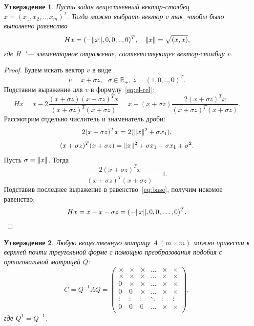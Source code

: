 \documentclass[11pt,a4paper,twoside]{report}
\numberwithin{equation}{section}
\newtheorem*{statement}{Утверждение}
\theoremstyle{definition}
\theoremstyle{plain}
\DeclarePairedDelimiter\norm{\lVert}{\rVert}
\begin{document}
\begin{statement}
    Пусть задан вещественный вектор-столбец $x=(x_1, x_2, .. , x_m)^{T}$.
    Тогда можно выбрать вектор $v$ так, чтобы было выполнено равенство
    $$
        Hx=(-\norm{x},0,0,..,0)^{T}, ~~~\norm{x}=\sqrt{(x,x)},
    $$
    где H~"--- элементарное отражение, соответствующее вектор-столбцу $v$.
\end{statement}
%
%
\begin{proof}
    Будем искать вектор $v$ в виде
    $$
        v=x+\sigma z, ~~~\sigma \in \mathbb{R}_+,~z=(1,0,..,0)^{T}.
    $$
    Подставим выражение для $v$ в формулу~\eqref{eq:el-rel}:
    \begin{equation}
        \label{eq:base}
        Hx=x-2\frac{(x+\sigma z)(x+\sigma z)^{T}x}{(x+\sigma z)^{T}(x+\sigma z)}=
        x-(x+\sigma z)\frac{2(x+\sigma z)^{T}x}{(x+\sigma z)^{T}(x+\sigma z)}.
    \end{equation}
    Рассмотрим отдельно числитель и знаменатель дроби:
    $$
        2(x+\sigma z)^{T}x=2(\norm{x}^{2}+\sigma x_1),
    $$
    $$
        (x+\sigma z)^{T}(x+\sigma z)=\norm{x}^{2}+\sigma x_1 + \sigma x_1 + \sigma^{2}.
    $$
    Пусть $\sigma=\norm{x}$. Тогда
    $$
        \frac{2(x+\sigma z)^{T}x}{(x+\sigma z)^{T}(x+\sigma z)}=1.
    $$
    Подставив последнее выражение в равенство~\eqref{eq:base}, получим искомое
    равенство:
    $$
        Hx=x-x-\sigma z=(-\norm{x},0,0,\ldots,0)^{T}.
    $$
\end{proof}
%
%
\begin{statement}
Любую вещественную матрицу $A~(m \times m)$ можно привести к верхней почти треугольной
форме с помощью преобразования подобия с ортогональной матрицей $Q$:
%
$$
    C = Q^{-1}AQ =
    \begin{pmatrix}
        \times & \times & \times & \ldots & \times & \times\\
        \times & \times & \times & \ldots & \times & \times\\
        0      & \times & \times & \ldots & \times & \times\\
        0      &      0 & \times & \ldots & \times & \times\\
        \vdots & \vdots & \vdots & \ddots & \vdots & \vdots\\
        0      &      0 & 0      & \ldots & \times & \times\\
    \end{pmatrix},
$$
где $Q^T = Q^{-1}$.
%
\end{statement}
\end{document}
